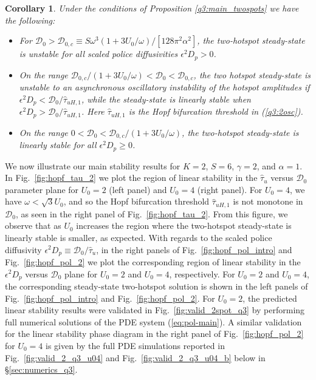 \documentclass{article}%
\newtheorem{cor}[theorem]{Corollary}
\begin{document}
\begin{cor}\label{q3:main_twospots_pol} Under the conditions of
Proposition \ref{q3:main_twospots} we have the following:
\begin{itemize}
  \item For ${\mathcal D}_0>{\mathcal D}_{0,c} \equiv {S\omega^3
    \left(1+{3U_0/\omega}\right)/[128\pi^2\alpha^2]}$, the two-hotspot
    steady-state is unstable for all scaled police diffusivities $\epsilon^2
    D_p>0$.
 \item On the range ${{\mathcal D}_{0,c}/\left(1+{3U_0/\omega}\right)}
   < {\mathcal D}_0 <{\mathcal D}_{0,c}$, the two hotspot
   steady-state is unstable to an asynchronous oscillatory instability
   of the hotspot amplitudes if $\epsilon^2 D_p<{{\mathcal
       D}_{0}/\hat{\tau}_{uH,1}}$, while the steady-state is linearly
   stable when $\epsilon^2 D_p>{{\mathcal
       D}_{0}/\hat{\tau}_{uH,1}}$. Here $\hat{\tau}_{uH,1}$ is the
   Hopf bifurcation threshold in (\ref{q3:2osc}).
\item On the range $0<{\mathcal D}_0 < {{\mathcal
    D}_{0,c}/\left(1+{3U_0/\omega}\right)}$, the two-hotspot
  steady-state is linearly stable for all $\epsilon^2 D_p\geq 0$.
\end{itemize}
\end{cor}

We now illustrate our main stability results for $K=2$, $S=6$,
$\gamma=2$, and $\alpha=1$. In Fig.~\ref{fig:hopf_tau_2} we plot the
region of linear stability in the $\hat{\tau}_u$ versus ${\mathcal
  D}_0$ parameter plane for $U_0=2$ (left panel) and $U_0=4$ (right
panel). For $U_0=4$, we have $\omega<\sqrt{3}U_0$, and so the Hopf
bifurcation threshold $\hat{\tau}_{uH,1}$ is not monotone in
${\mathcal D}_0$, as seen in the right panel of
Fig.~\ref{fig:hopf_tau_2}. From this figure, we observe that as $U_0$
increases the region where the two-hotspot steady-state is linearly
stable is smaller, as expected. With regards to the scaled police
diffusivity $\epsilon^2 D_p\equiv {{\mathcal D}_0/\hat{\tau}_u}$, in
the right panels of Fig.~\ref{fig:hopf_pol_intro} and
Fig.~\ref{fig:hopf_pol_2} we plot the corresponding region of linear
stability in the $\epsilon^2 D_p$ versus ${\mathcal D}_{0}$ plane for
$U_0=2$ and $U_0=4$, respectively. For $U_0=2$ and $U_0=4$, the
corresponding steady-state two-hotspot solution is shown in the left
panels of Fig.~\ref{fig:hopf_pol_intro} and Fig.~\ref{fig:hopf_pol_2}.
For $U_0=2$, the predicted linear stability results were validated in
Fig.~\ref{fig:valid_2spot_q3} by performing full numerical
solutions of the PDE system (\ref{eq:pol-main}). A similar validation
for the linear stability phase diagram in the right panel of
Fig.~\ref{fig:hopf_pol_2} for $U_0=4$ is given by the full PDE
simulations reported in Fig.~\ref{fig:valid_2_q3_u04} and
Fig.~\ref{fig:valid_2_q3_u04_b} below in \S \ref{sec:numerics_q3}.
\end{document}

